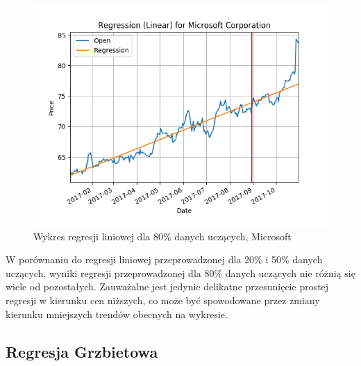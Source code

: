 \begin{figure}[h!]
\centering
\includegraphics[width=150mm]{pictures/plots/microsoft_linear_80.png}
\caption{Wykres regresji liniowej dla 80\% danych uczących, Microsoft}
\label{fig:Wykres regresji liniowej dla 80\% danych uczących, Microsoft}
\end{figure}

W porównaniu do regresji liniowej przeprowadzonej dla 20\% i 50\% danych uczących, wyniki regresji przeprowadzonej dla 80\% danych uczących nie różnią się wiele od pozostałych.
Zauważalne jest jedynie delikatne przesunięcie prostej regresji w kierunku cen niższych, co może być spowodowane przez zmiany kierunku mniejszych trendów obecnych na wykresie.

\subsection{Regresja Grzbietowa}

